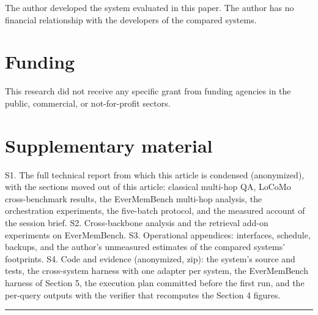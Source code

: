 \documentclass[a4paper,fleqn]{cas-sc}
\begin{document}
The author developed the system evaluated in this paper. The author has no financial relationship with the developers of the compared systems.

\section*{Funding}

This research did not receive any specific grant from funding agencies in the public, commercial, or not-for-profit sectors.

\section*{Supplementary material}

S1. The full technical report from which this article is condensed (anonymized), with the sections moved out of this article: classical multi-hop QA, LoCoMo cross-benchmark results, the EverMemBench multi-hop analysis, the orchestration experiments, the five-batch protocol, and the measured account of the session brief.
S2. Cross-backbone analysis and the retrieval add-on experiments on EverMemBench.
S3. Operational appendices: interfaces, schedule, backups, and the author's unmeasured estimates of the compared systems' footprints.
S4. Code and evidence (anonymized, zip): the system's source and tests, the cross-system harness with one adapter per system, the EverMemBench harness of Section 5, the execution plan committed before the first run, and the per-query outputs with the verifier that recomputes the Section 4 figures.

\begin{center}\rule{0.5\linewidth}{0.5pt}\end{center}
\end{document}
